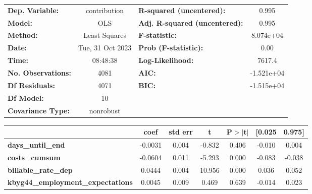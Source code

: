 \begin{center}
\begin{tabular}{lclc}
\toprule
\textbf{Dep. Variable:}                   &   contribution   & \textbf{  R-squared (uncentered):}      &     0.995   \\
\textbf{Model:}                           &       OLS        & \textbf{  Adj. R-squared (uncentered):} &     0.995   \\
\textbf{Method:}                          &  Least Squares   & \textbf{  F-statistic:       }          & 8.074e+04   \\
\textbf{Date:}                            & Tue, 31 Oct 2023 & \textbf{  Prob (F-statistic):}          &     0.00    \\
\textbf{Time:}                            &     08:48:38     & \textbf{  Log-Likelihood:    }          &    7617.4   \\
\textbf{No. Observations:}                &        4081      & \textbf{  AIC:               }          & -1.521e+04  \\
\textbf{Df Residuals:}                    &        4071      & \textbf{  BIC:               }          & -1.515e+04  \\
\textbf{Df Model:}                        &          10      & \textbf{                     }          &             \\
\textbf{Covariance Type:}                 &    nonrobust     & \textbf{                     }          &             \\
\bottomrule
\end{tabular}
\begin{tabular}{lcccccc}
                                          & \textbf{coef} & \textbf{std err} & \textbf{t} & \textbf{P$> |$t$|$} & \textbf{[0.025} & \textbf{0.975]}  \\
\midrule
\textbf{days\_until\_end}                 &      -0.0031  &        0.004     &    -0.832  &         0.406        &       -0.010    &        0.004     \\
\textbf{costs\_cumsum}                    &      -0.0604  &        0.011     &    -5.293  &         0.000        &       -0.083    &       -0.038     \\
\textbf{billable\_rate\_dep}              &       0.0444  &        0.004     &    10.956  &         0.000        &        0.036    &        0.052     \\
\textbf{kbyg44\_employment\_expectations} &       0.0045  &        0.009     &     0.469  &         0.639        &       -0.014    &        0.023     \\

\end{tabular}
\end{center}
